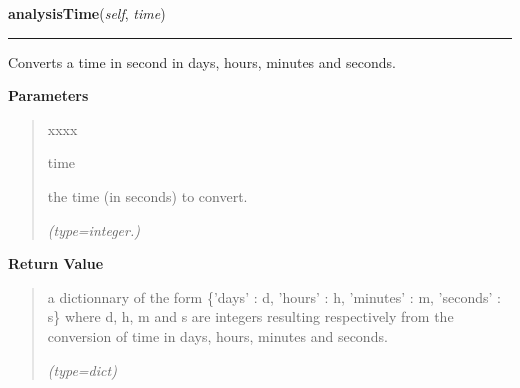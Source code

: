     \label{nMOLDYN:Analysis:Analysis:Analysis:analysisTime}

    \vspace{0.5ex}

\hspace{.8\funcindent}\begin{boxedminipage}{\funcwidth}

    \raggedright \textbf{analysisTime}(\textit{self}, \textit{time})

    \vspace{-1.5ex}

    \rule{\textwidth}{0.5\fboxrule}
\setlength{\parskip}{2ex}
    Converts a time in second in days, hours, minutes and seconds.

\setlength{\parskip}{1ex}
      \textbf{Parameters}
      \vspace{-1ex}

      \begin{quote}
        \begin{Ventry}{xxxx}

          \item[time]

          the time (in seconds) to convert.

            {\it (type=integer.)}

        \end{Ventry}

      \end{quote}

      \textbf{Return Value}
    \vspace{-1ex}

      \begin{quote}
      a dictionnary of the form \{'days' : d, 'hours' : h, 'minutes' : m, 
      'seconds' : s\} where d, h, m and s are integers resulting 
      respectively from the conversion of {\textbar}time{\textbar} in days,
      hours, minutes and seconds.

      {\it (type=dict)}

      \end{quote}

    \end{boxedminipage}

    \label{nMOLDYN:Analysis:Analysis:Analysis:weightingScheme}

